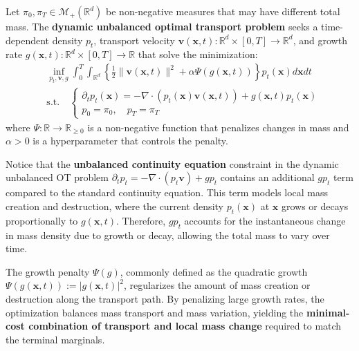 \documentclass{article}
\begin{document}
\begin{definition}
Let $\pi_0,\pi_T\in \mathcal{M}_+(\mathbb{R}^d)$ be non-negative measures that may have different total mass. The \textbf{dynamic unbalanced optimal transport problem} seeks a time-dependent density $p_t$, transport velocity $\boldsymbol{v}(\boldsymbol{x},t):\mathbb{R}^d\times[0,T] \to \mathbb{R}^d$, and growth rate $g(\boldsymbol{x},t):\mathbb{R}^d\times[0,T] \to \mathbb{R}$ that solve the minimization:
\begin{align}
    &\inf_{p_t, \boldsymbol{v}, g}\int_0^T\int_{\mathbb{R}^d}\left\{\frac{1}{2}\|\boldsymbol{v}(\boldsymbol{x},t)\| ^2+\alpha\Psi(g(\boldsymbol{x},t))\right\}p_t(\boldsymbol{x})d\boldsymbol{x}dt\\
    &\text{s.t.}\quad \begin{cases}
        \partial_t p_t(\boldsymbol{x})=-\nabla\cdot (p_t(\boldsymbol{x})\boldsymbol{v}(\boldsymbol{x},t))+g(\boldsymbol{x},t)p_t(\boldsymbol{x})\\
        p_0=\pi_0, \quad p_T=\pi_T
    \end{cases}
\end{align}
where $\Psi:\mathbb{R}\to \mathbb{R}_{\geq 0}$ is a non-negative function that penalizes changes in mass and $\alpha> 0$ is a hyperparameter that controls the penalty.
\end{definition}
Notice that the \textbf{unbalanced continuity equation} constraint in the dynamic unbalanced OT problem $\partial_t p_t=-\nabla\cdot (p_t\boldsymbol{v})+gp_t$ contains an additional $gp_t$ term compared to the standard continuity equation. This term models local mass creation and destruction, where the current density $p_t(\boldsymbol{x})$ at $\boldsymbol{x}$ grows or decays proportionally to $g(\boldsymbol{x},t)$. Therefore, $gp_t$ accounts for the instantaneous change in mass density due to growth or decay, allowing the total mass to vary over time.

The growth penalty $\Psi(g)$, commonly defined as the quadratic growth $\Psi(g(\boldsymbol{x},t)):= |g(\boldsymbol{x},t)|^2$, regularizes the amount of mass creation or destruction along the transport path. By penalizing large growth rates, the optimization balances mass transport and mass variation, yielding the \textbf{minimal-cost combination of transport and local mass change} required to match the terminal marginals.
\end{document}
